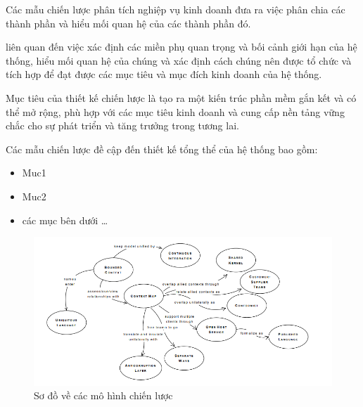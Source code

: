 Các mẫu chiến lược phân tích nghiệp vụ kinh doanh đưa ra việc phân chia các thành phần và hiểu mối quan hệ của các thành phần đó.

liên quan đến việc xác định các miền phụ quan trọng và bối cảnh giới hạn của hệ thống, hiểu mối quan hệ của chúng và xác định cách chúng nên được tổ chức và tích hợp để đạt được các mục tiêu và mục đích kinh doanh của hệ thống.

%

Mục tiêu của thiết kế chiến lược là tạo ra một kiến trúc phần mềm gắn kết và có thể mở rộng, phù hợp với các mục tiêu kinh doanh và cung cấp nền tảng vững chắc cho sự phát triển và tăng trưởng trong tương lai.

%

Các mẫu chiến lược đề cập đến thiết kế tổng thể của hệ thống bao gồm:

\begin{itemize}

\item Muc1

\item Muc2

\item các mục bên dưới \dots

\end{itemize}

%

\begin{figure}[H]
    \centering
    \includegraphics[width = 1\textwidth]{pictures/CacMoHinhChienLuoc/temp.png}
    \caption{Sơ đồ về các mô hình chiến lược}
    \end{figure}
 





